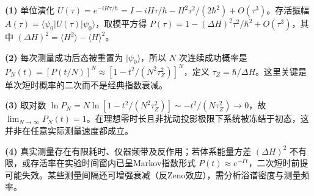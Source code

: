 \par\noindent\textbf{(1)} 单位演化 \(U(\tau)=e^{-iH\tau/\hbar}=I-iH\tau/\hbar-H^2\tau^2/(2\hbar^2)+O(\tau^3)\)。存活振幅 \(A(\tau)=\langle\psi_0|U(\tau)|\psi_0\rangle\)，取模平方得 \(P(\tau)=1-(\Delta H)^2\tau^2/\hbar^2+O(\tau^3)\)，其中 \((\Delta H)^2=\langle H^2\rangle-\langle H\rangle^2\)。
\par\noindent\textbf{(2)} 每次测量成功后态被重置为 \(|\psi_0\rangle\)，所以 \(N\) 次连续成功概率是 \(P_N(t)=[P(t/N)]^N\approx[1-t^2/(N^2\tau_Z^2)]^N\)，定义 \(\tau_Z=\hbar/\Delta H\)。这里关键是单次短时概率的二次而不是经典指数衰减。
\par\noindent\textbf{(3)} 取对数 \(\ln P_N=N\ln[1-t^2/(N^2\tau_Z^2)]\sim-t^2/(N\tau_Z^2)\to0\)，故 \(\lim_{N\to\infty}P_N(t)=1\)。在理想零时长且非扰动投影极限下系统被冻结于初态，这并非在任意实际测量速度都成立。
\par\noindent\textbf{(4)} 真实测量存在有限耗时、仪器频带及反作用；若体系能量方差 \((\Delta H)^2\) 不有限，或存活率在实验时间窗内已呈Markov指数形式 \(P(t)\approx e^{-\Gamma t}\)，二次短时前提可能失效。某些测量间隔还可增强衰减（反Zeno效应），需分析浴谱密度与测量频率。
